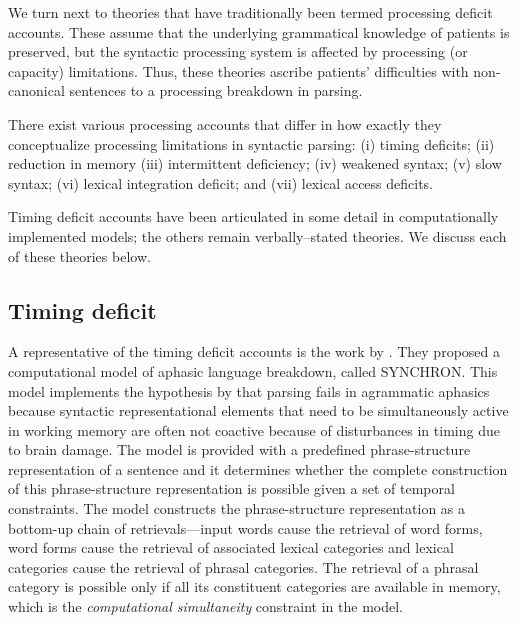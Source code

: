 \documentclass{cambridge7A}\usepackage[]{graphicx}\usepackage[]{color}
\begin{document}
We turn next to theories that have traditionally been termed processing deficit accounts. These assume that the underlying grammatical knowledge of patients is preserved, but the syntactic processing system is affected by processing (or capacity) limitations. Thus, these theories ascribe patients' difficulties with non-canonical sentences to a processing breakdown in parsing. 

There exist various processing accounts that differ in how exactly they conceptualize processing limitations in syntactic parsing:
(i) timing deficits;
(ii) reduction in memory
(iii) intermittent deficiency;
(iv) weakened syntax;
(v) slow syntax;
(vi) lexical integration deficit;
and (vii) lexical access deficits.

Timing deficit accounts have been articulated in some detail in computationally implemented models; the others remain verbally--stated theories. We discuss each of these theories below.

\subsection{Timing deficit}
A representative of the timing deficit accounts is the work by 
\cite{Haarmann-Kolk-1991}. They proposed a computational model of aphasic language breakdown, called SYNCHRON. This model implements the hypothesis by \cite{Kolk-vanGrunsven-1985} that parsing fails in agrammatic aphasics because syntactic representational elements that need to be simultaneously active in working memory are often not coactive because of disturbances in timing due to brain damage. The model is provided with a predefined phrase-structure representation of a sentence and it determines whether the complete construction of this phrase-structure representation is possible given a set of temporal constraints. The model constructs the phrase-structure representation as a bottom-up chain of retrievals---input words cause the retrieval of word forms, word forms cause the retrieval of associated lexical categories and lexical categories cause the retrieval of phrasal categories. The retrieval of a phrasal category is possible only if all its constituent categories are available in memory, which is the \emph{computational simultaneity} constraint in the model.
\end{document}
